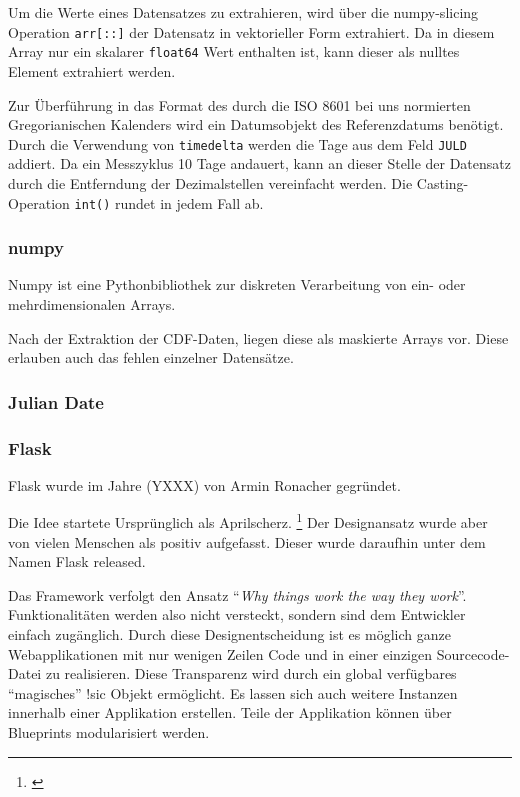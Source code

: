     Um die Werte eines Datensatzes zu extrahieren, wird über die numpy-slicing Operation \texttt{arr[::]} der Datensatz in vektorieller Form extrahiert. Da in diesem Array nur ein skalarer \texttt{float64} Wert enthalten ist, kann dieser als nulltes Element extrahiert werden.
    
    Zur Überführung in das Format des durch die ISO 8601 bei uns normierten Gregorianischen Kalenders wird ein Datumsobjekt des Referenzdatums benötigt. Durch die Verwendung von \texttt{timedelta} werden die Tage aus dem Feld \texttt{JULD} addiert. Da ein Messzyklus 10 Tage andauert, kann an dieser Stelle der Datensatz durch die Entferndung der Dezimalstellen vereinfacht werden. Die Casting-Operation \texttt{int()} rundet in jedem Fall ab.
    
    \subsubsection{numpy}
    
    Numpy ist eine Pythonbibliothek zur diskreten Verarbeitung von ein- oder mehrdimensionalen Arrays. 
    
    Nach der Extraktion der CDF-Daten, liegen diese als maskierte Arrays vor. Diese erlauben auch das fehlen einzelner Datensätze.

\subsubsection{Julian Date}
        
    \subsubsection{Flask}
    
    Flask wurde im Jahre (YXXX) von Armin Ronacher gegründet. 
    
    Die Idee startete Ursprünglich als Aprilscherz. \footnote{\cite{openingtheflask}} Der Designansatz wurde aber von vielen Menschen als positiv aufgefasst. Dieser wurde daraufhin unter dem Namen Flask released.
    
    
    Das Framework verfolgt den Ansatz "`\textit{Why things work the way they work}"'. Funktionalitäten werden also nicht versteckt, sondern sind dem Entwickler einfach zugänglich. Durch diese Designentscheidung ist es möglich ganze Webapplikationen mit nur wenigen Zeilen Code und in einer einzigen Sourcecode-Datei zu realisieren. Diese Transparenz wird durch ein global verfügbares "`magisches"' !sic Objekt ermöglicht. 
    Es lassen sich auch weitere Instanzen innerhalb einer Applikation erstellen. 
    Teile der Applikation können über Blueprints modularisiert werden.
    
